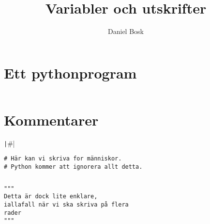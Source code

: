 \title{%
  Variabler och utskrifter
}
\author{Daniel Bosk}


\mode*

\begin{abstract}
  
\end{abstract}


\section{Ett pythonprogram}

\begin{frame}[fragile]
  \inputminted[linenos,firstline=11]{python}{examples/age.py}
\end{frame}

\section{Kommentarer}

\begin{frame}[fragile]
  \begin{center}
    \texttt|#|
  \end{center}
\end{frame}

\begin{frame}[fragile]
  \begin{example}
    \begin{verbatim}
# Här kan vi skriva for människor.
# Python kommer att ignorera allt detta.
    \end{verbatim}
  \end{example}
\end{frame}

\begin{frame}[fragile]
  \inputminted[highlightlines={16,24},linenos,firstline=11]{python}{examples/age.py}
\end{frame}

\begin{frame}[fragile]
  \begin{example}
    \begin{verbatim}
"""
Detta är dock lite enklare,
iallafall när vi ska skriva på flera
rader
"""
    \end{verbatim}
  \end{example}
\end{frame}

